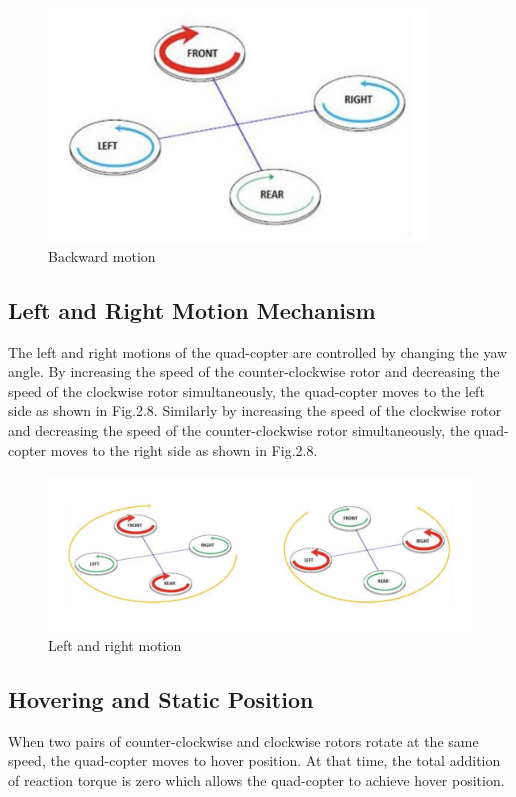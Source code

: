 \begin{figure}[h!]
\centering
\includegraphics[width=10cm]{./Figures/backward_motion_qc.png}
\caption{Backward motion}
\label{Backward_motion}
\end{figure}

\subsection{Left and Right Motion Mechanism}
\par The left and right motions of the quad-copter are controlled by changing the yaw angle. By increasing the speed of the counter-clockwise rotor and decreasing the speed of the clockwise rotor simultaneously, the quad-copter moves to the left side as shown in Fig.2.8. Similarly by increasing the speed of the clockwise rotor and decreasing the speed of the counter-clockwise rotor simultaneously, the quad-copter moves to the right side as shown in Fig.2.8.

\begin{figure}[h!]
\centering
\includegraphics[width=\columnwidth]{./Figures/left_ryt_motion_qc.png}
\caption{Left and right motion}
\label{Left_and_right_motion}
\end{figure}

\subsection{Hovering and Static Position}
\par When two pairs of counter-clockwise and clockwise rotors rotate at the same speed, the quad-copter moves to hover position. At that time, the total addition of reaction torque is zero which allows the quad-copter to achieve hover position.

